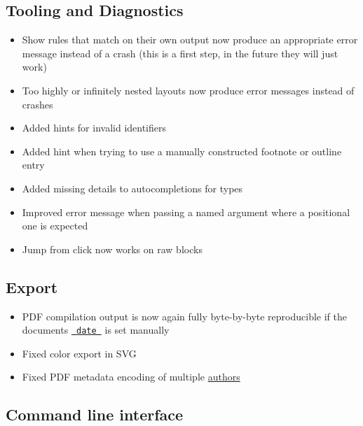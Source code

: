 \subsection{Tooling and Diagnostics}\label{tooling-and-diagnostics}

\begin{itemize}
\tightlist
\item
  Show rules that match on their own output now produce an appropriate
  error message instead of a crash (this is a first step, in the future
  they will just work)
\item
  Too highly or infinitely nested layouts now produce error messages
  instead of crashes
\item
  Added hints for invalid identifiers
\item
  Added hint when trying to use a manually constructed footnote or
  outline entry
\item
  Added missing details to autocompletions for types
\item
  Improved error message when passing a named argument where a
  positional one is expected
\item
  Jump from click now works on raw blocks
\end{itemize}

\subsection{Export}\label{export}

\begin{itemize}
\tightlist
\item
  PDF compilation output is now again fully byte-by-byte reproducible if
  the document\textquotesingle s
  \href{/docs/reference/model/document/\#parameters-date}{\texttt{\ date\ }}
  is set manually
\item
  Fixed color export in SVG
\item
  Fixed PDF metadata encoding of multiple
  \href{/docs/reference/model/document/\#parameters-author}{authors}
\end{itemize}

\subsection{Command line interface}\label{command-line-interface}

